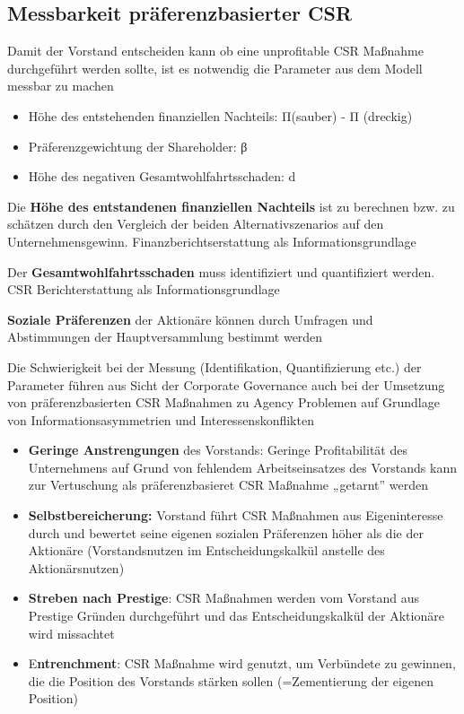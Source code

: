 \documentclass[
]{article}
\providecommand{\tightlist}{%
  \setlength{\itemsep}{0pt}\setlength{\parskip}{0pt}}
\begin{document}
\hypertarget{messbarkeit-pruxe4ferenzbasierter-csr}{%
\subsection{Messbarkeit präferenzbasierter
CSR}\label{messbarkeit-pruxe4ferenzbasierter-csr}}

Damit der Vorstand entscheiden kann ob eine unprofitable CSR Maßnahme
durchgeführt werden sollte, ist es notwendig die Parameter aus dem
Modell messbar zu machen

\begin{itemize}
\tightlist
\item
  Höhe des entstehenden finanziellen Nachteils: Π(sauber) - Π (dreckig)
\item
  Präferenzgewichtung der Shareholder: β
\item
  Höhe des negativen Gesamtwohlfahrtsschaden: d
\end{itemize}

Die \textbf{Höhe des entstandenen finanziellen Nachteils} ist zu
berechnen bzw. zu schätzen durch den Vergleich der beiden
Alternativszenarios auf den Unternehmensgewinn. Finanzberichtserstattung
als Informationsgrundlage

Der \textbf{Gesamtwohlfahrtsschaden} muss identifiziert und
quantifiziert werden. CSR Berichterstattung als Informationsgrundlage

\textbf{Soziale Präferenzen} der Aktionäre können durch Umfragen und
Abstimmungen der Hauptversammlung bestimmt werden

Die Schwierigkeit bei der Messung (Identifikation, Quantifizierung etc.)
der Parameter führen aus Sicht der Corporate Governance auch bei der
Umsetzung von präferenzbasierten CSR Maßnahmen zu Agency Problemen auf
Grundlage von Informationsasymmetrien und Interessenskonflikten

\begin{itemize}
\tightlist
\item
  \textbf{Geringe Anstrengungen} des Vorstands: Geringe Profitabilität
  des Unternehmens auf Grund von fehlendem Arbeitseinsatzes des
  Vorstands kann zur Vertuschung als präferenzbasieret CSR Maßnahme
  „getarnt'' werden
\item
  \textbf{Selbstbereicherung: }Vorstand führt CSR Maßnahmen aus
  Eigeninteresse durch und bewertet seine eigenen sozialen Präferenzen
  höher als die der Aktionäre (Vorstandsnutzen im Entscheidungskalkül
  anstelle des Aktionärsnutzen)
\item
  \textbf{Streben nach Prestige}: CSR Maßnahmen werden vom Vorstand aus
  Prestige Gründen durchgeführt und das Entscheidungskalkül der
  Aktionäre wird missachtet
\item
  E\textbf{ntrenchment}: CSR Maßnahme wird genutzt, um Verbündete zu
  gewinnen, die die Position des Vorstands stärken sollen (=Zementierung
  der eigenen Position)
\end{itemize}
\end{document}
